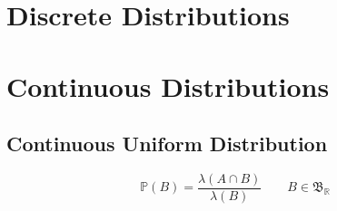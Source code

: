 \section{Discrete Distributions}

\section{Continuous Distributions}

\subsection{Continuous Uniform Distribution}

\begin{definition}
    \begin{equation}
        \mathbb{P}(B) = \frac{\lambda(A \cap B)}{\lambda (B)} \qquad B \in \mathfrak{B}_\mathbb{R}
    \end{equation}
\end{definition}

\begin{lemma}
    
\end{lemma}
